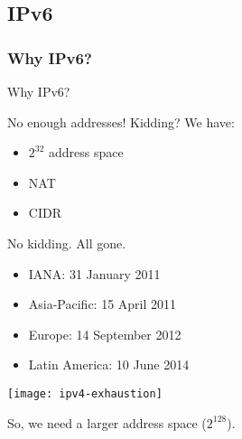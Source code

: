 \subsection{IPv6}

\subsubsection{Why IPv6?}
  


\begin{frame}{Why IPv6?}
  \begin{minipage}{.54\linewidth}
  \begin{iblock}{No enough addresses!}
    Kidding? We have:
    \begin{itemize}
    \item $2^{32}$ address space
    \item NAT
    \item CIDR
    \end{itemize}
    No kidding. All gone.
    \begin{itemize}
    \item IANA: 31 January 2011
    \item Asia-Pacific: 15 April 2011
    \item Europe: 14 September 2012
    \item Latin America: 10 June 2014
    \end{itemize}
  \end{iblock}
  \end{minipage}\hfill
  \begin{minipage}{.45\linewidth}
    \texttt{[image: ipv4-exhaustion]}
  \end{minipage}

  So, we need a larger address space ($2^{128}$).
\end{frame}

